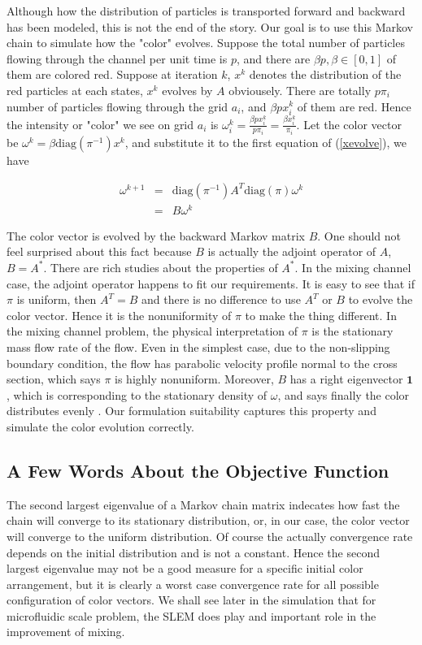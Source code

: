 \documentclass{article}
\begin{document}
Although how the distribution of particles is transported forward and backward has been modeled, this is not the end of the story. Our goal is to use this Markov chain to simulate how the "color" evolves. Suppose the total number of particles flowing through the channel per unit time is $p$, and there are $\beta p, \beta \in [0,1]$ of them are colored red. Suppose at iteration $k$, $x^k$ denotes the distribution of the red particles at each states, $x^k$ evolves by $A$ obviousely. There are totally $p \pi_i$ number of particles flowing through the grid $a_i$, and $\beta p x^k_i$ of them are red. Hence the intensity or "color" we see on grid $a_i$ is $\omega^k_i=\frac{\beta p x^k_i}{p \pi_i} = \frac{\beta x^k_i}{\pi_i}$. Let the color vector be $\omega^k = \beta \text{diag}(\pi^{-1})x^k $, and substitute it to the first equation of (\ref{xevolve}), we have   

\begin{eqnarray}
\omega^{k+1} &=& \text{diag}(\pi^{-1}) A^T \text{diag}(\pi) \omega^{k}\\
             &=& B \omega^{k}
\end{eqnarray}

The color vector is evolved by the backward Markov matrix $B$. One should not feel surprised about this fact because $B$ is actually the adjoint operator of $A$, $B= A^*$. There are rich studies about the properties of $A^*$. In the mixing channel case, the adjoint operator happens to fit our requirements. It is easy to see that if $\pi$ is uniform, then $A^T=B$ and there is no difference to use $A^T$ or $B$ to evolve the color vector. Hence it is the nonuniformity of $\pi$ to make the thing different. In the mixing channel problem, the physical interpretation of $\pi$ is the stationary mass flow rate of the flow. Even in the simplest case, due to the non-slipping boundary condition, the flow has parabolic velocity profile normal to the cross section, which says $\pi$ is highly nonuniform. Moreover, $B$ has a right eigenvector $\mathbf{1}$, which is corresponding to the stationary density of $\omega$, and says finally the color distributes evenly . Our formulation suitability captures this property and simulate the color evolution correctly.


\subsection{A Few Words About the Objective Function}
The second largest eigenvalue of a Markov chain matrix indecates how fast the chain will converge to its stationary distribution, or, in our case, the color vector will converge to the uniform distribution. Of course the actually convergence rate depends on the initial distribution and is not a constant. Hence the second largest eigenvalue may not be a good measure for a specific initial color arrangement, but it is clearly a worst case convergence rate for all possible configuration of color vectors. We shall see later in the simulation that for microfluidic scale problem, the SLEM does play and important role in the improvement of mixing.    
\end{document}
